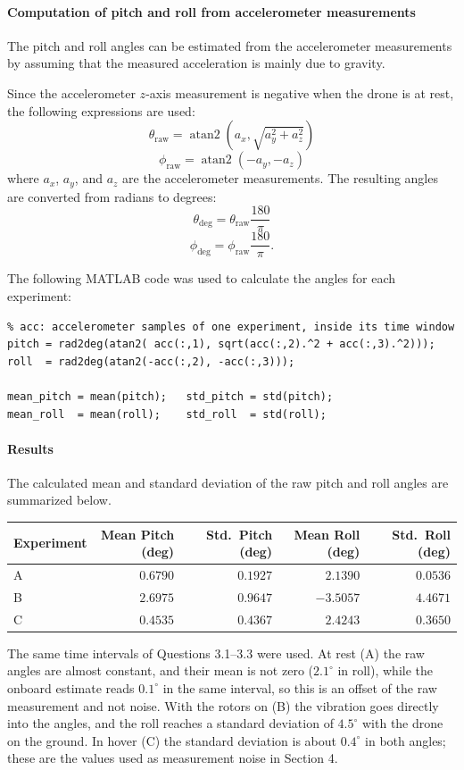 \documentclass[10pt,a4paper]{article}
\newenvironment{answer}{%
  \begin{tcolorbox}[breakable,enhanced,colback=white,colframe=greyline,
    boxrule=0.6pt,arc=2pt,left=8pt,right=8pt,top=7pt,bottom=7pt,
    before skip=0pt,after skip=12pt]
}{\end{tcolorbox}}
\begin{document}
\begin{answer}
\paragraph{Computation of pitch and roll from accelerometer measurements}
The pitch and roll angles can be estimated from the accelerometer measurements by assuming that the measured acceleration is mainly due to gravity.

Since the accelerometer \(z\)-axis measurement is negative when the drone is at rest, the following expressions are used:
\[
\theta_{\mathrm{raw}} =
\operatorname{atan2}
\left(
a_x,\sqrt{a_y^2+a_z^2}
\right)
\]
\[
\phi_{\mathrm{raw}} =
\operatorname{atan2}(-a_y,-a_z)
\]
where \(a_x\), \(a_y\), and \(a_z\) are the accelerometer measurements. The resulting angles are converted from radians to degrees:
\[
\theta_{\mathrm{deg}}=
\theta_{\mathrm{raw}}\frac{180}{\pi}
\]
\[
\phi_{\mathrm{deg}}=
\phi_{\mathrm{raw}}\frac{180}{\pi}.
\]

The following MATLAB code was used to calculate the angles for each experiment:

\begin{lstlisting}
% acc: accelerometer samples of one experiment, inside its time window
pitch = rad2deg(atan2( acc(:,1), sqrt(acc(:,2).^2 + acc(:,3).^2)));
roll  = rad2deg(atan2(-acc(:,2), -acc(:,3)));

mean_pitch = mean(pitch);   std_pitch = std(pitch);
mean_roll  = mean(roll);    std_roll  = std(roll);
\end{lstlisting}

\paragraph{Results}
The calculated mean and standard deviation of the raw pitch and roll angles are summarized below.

\begin{center}
\begin{tabular}{@{}lrrrr@{}}
\toprule
Experiment & Mean Pitch (deg) & Std.\ Pitch (deg) & Mean Roll (deg) & Std.\ Roll (deg) \\
\midrule
A & $0.6790$ & $0.1927$ & $2.1390$  & $0.0536$ \\
B & $2.6975$ & $0.9647$ & $-3.5057$ & $4.4671$ \\
C & $0.4535$ & $0.4367$ & $2.4243$  & $0.3650$ \\
\bottomrule
\end{tabular}
\end{center}

The same time intervals of Questions 3.1--3.3 were used. At rest (A) the raw angles are almost constant, and their mean is not zero ($2.1^\circ$ in roll), while the onboard estimate reads $0.1^\circ$ in the same interval, so this is an offset of the raw measurement and not noise. With the rotors on (B) the vibration goes directly into the angles, and the roll reaches a standard deviation of $4.5^\circ$ with the drone on the ground. In hover (C) the standard deviation is about $0.4^\circ$ in both angles; these are the values used as measurement noise in Section 4.
\end{answer}
\end{document}
